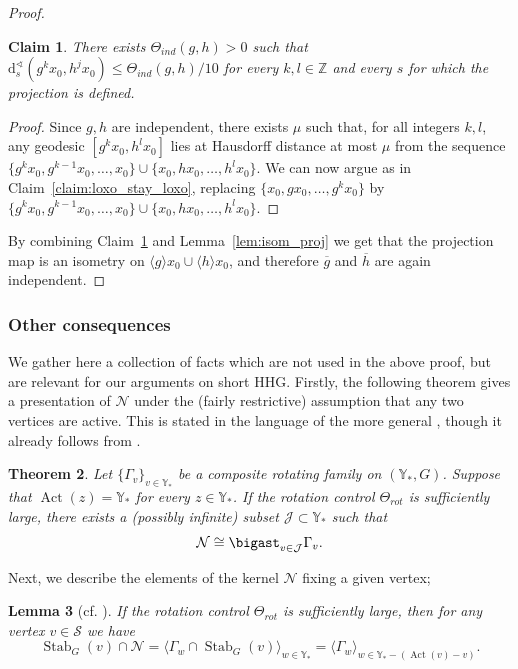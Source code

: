 \documentclass[svgnames]{amsart}
\theoremstyle{plain}
\newtheorem{thm}{Theorem}[section]
\newtheorem{lemma}[thm]{Lemma}
\newtheorem{claim}[thm]{Claim}
\theoremstyle{definition}
\newenvironment{claimproof}{\renewcommand{\qedsymbol}{$\blacksquare$}\begin{proof}}{\end{proof}}
\newcommand{\ov}[1]{\overline{#1}}
\newcommand{\dist}{\mathrm{d}}
\newcommand{\Stab}[2]{\operatorname{Stab}_{#1}(#2)}
\newcommand{\Act}{\operatorname{Act}}
\newcommand{\N}{\mathcal{N}}
\renewcommand{\angle}{\sphericalangle}
\begin{document}
\begin{proof}
     \begin{claim}\label{claim:ind_stay_ind}
    There exists $\Theta_{ind}(g,h)>0$ such that $\dist^\angle_s(g^kx_0,h^jx_0)\le \Theta_{ind}(g,h)/10$ for every $k,l\in \mathbb Z$ and every $s$ for which the projection is defined. 
    \end{claim}
    
    \begin{claimproof}
        Since $g,h$ are independent, there exists $\mu$ such that, for all integers $k,l$, any geodesic $[g^k x_0 , h^l x_0 ]$ lies at Hausdorff distance at most $\mu$ from the sequence $\{g^k x_0 , g^{k-1} x_0 , \ldots , x_0 \} \cup \{x_0 , h x_0 , \ldots , h^l x_0 \}$. We can now argue as in Claim~\ref{claim:loxo_stay_loxo}, replacing $\{x_0 , gx_0 , \ldots , g^k x_0 \}$ by $\{g^k x_0 , g^{k-1} x_0 , \ldots , x_0 \} \cup \{x_0 , h x_0 , \ldots , h^l x_0 \}$.
    \end{claimproof}

    By combining Claim~\ref{claim:ind_stay_ind} and Lemma~\ref{lem:isom_proj} we get that the projection map is an isometry on $\langle g\rangle x_0\cup \langle h\rangle x_0$, and therefore $\ov g$ and $\ov h$ are again independent.
\end{proof}

\subsubsection{Other consequences}
We gather here a collection of facts which are not used in the above proof, but are relevant for our arguments on short HHG. Firstly, the following theorem gives a presentation of $\N$ under the (fairly restrictive) assumption that any two vertices are active. This is stated in the language of the more general \cite[Theorem 2.2]{dahmani:rotating}, though it already follows from \cite[Theorem 5.3.(a)]{DGO}.

\begin{thm}\label{lem:structure_of_kernel}
    Let $\{\Gamma_v\}_{v\in \mathbb{Y}_*}$ be a composite rotating family on $(\mathbb{Y}_*,G)$. Suppose that $\Act(z)=\mathbb{Y}_*$ for every $z\in \mathbb{Y}_* $. If the rotation control $\Theta_{rot}$ is sufficiently large, there exists a (possibly infinite) subset $\mathcal J\subset \mathbb{Y}_*$ such that
    $$\N \cong \bigast_{v\in \mathcal J}\Gamma_v.$$
\end{thm}

Next, we describe the elements of the kernel $\N$ fixing a given vertex;
\begin{lemma}[{cf. \cite[Proposition 4.8]{dfdt}}] \label{lem:stabiliser_in_scpg}
    If the rotation control $\Theta_{rot}$ is sufficiently large, then for any vertex $v\in \mathcal S$ we have
     $$\Stab{G}{v}\cap \N=\langle\Gamma_w\cap\Stab{G}{v}\rangle_{w\in \mathbb{Y}_*}= \langle\Gamma_w\rangle_{w\in \mathbb{Y}_*-(\Act(v)-v)}.$$
\end{lemma}
\end{document}
